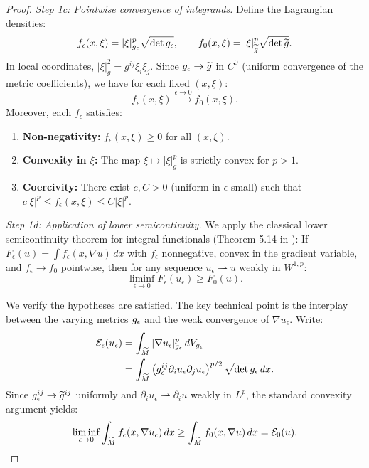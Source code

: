 \begin{proof}
\textit{Step 1c: Pointwise convergence of integrands.}
Define the Lagrangian densities:
\[
    f_\epsilon(x,\xi) = |\xi|_{g_\epsilon}^p \sqrt{\det g_\epsilon}, \qquad f_0(x,\xi) = |\xi|_{\widetilde{g}}^p \sqrt{\det \widetilde{g}}.
\]
In local coordinates, $|\xi|_g^2 = g^{ij}\xi_i \xi_j$. Since $g_\epsilon \to \widetilde{g}$ in $C^0$ (uniform convergence of the metric coefficients), we have for each fixed $(x,\xi)$:
\[
    f_\epsilon(x,\xi) \xrightarrow{\epsilon \to 0} f_0(x,\xi).
\]
Moreover, each $f_\epsilon$ satisfies:
\begin{enumerate}
    \item[(i)] \textbf{Non-negativity:} $f_\epsilon(x,\xi) \ge 0$ for all $(x,\xi)$.
    \item[(ii)] \textbf{Convexity in $\xi$:} The map $\xi \mapsto |\xi|_g^p$ is strictly convex for $p > 1$.
    \item[(iii)] \textbf{Coercivity:} There exist $c, C > 0$ (uniform in $\epsilon$ small) such that $c|\xi|^p \le f_\epsilon(x,\xi) \le C|\xi|^p$.
\end{enumerate}

\textit{Step 1d: Application of lower semicontinuity.}
We apply the classical lower semicontinuity theorem for integral functionals (Theorem 5.14 in \cite{dalmaso1993}): If $F_\epsilon(u) = \int f_\epsilon(x, \nabla u) \, dx$ with $f_\epsilon$ nonnegative, convex in the gradient variable, and $f_\epsilon \to f_0$ pointwise, then for any sequence $u_\epsilon \rightharpoonup u$ weakly in $W^{1,p}$:
\[
    \liminf_{\epsilon \to 0} F_\epsilon(u_\epsilon) \ge F_0(u).
\]

We verify the hypotheses are satisfied. The key technical point is the interplay between the varying metrics $g_{\epsilon}$ and the weak convergence of $\nabla u_\epsilon$. Write:
\begin{align*}
    \mathcal{E}_\epsilon(u_\epsilon) &= \int_{\widetilde{M}} |\nabla u_\epsilon|_{g_{\epsilon}}^p \, dV_{g_{\epsilon}} \\
    &= \int_{\widetilde{M}} \left( g_\epsilon^{ij} \partial_i u_\epsilon \partial_j u_\epsilon \right)^{p/2} \sqrt{\det g_\epsilon} \, dx.
\end{align*}
Since $g_\epsilon^{ij} \to \widetilde{g}^{ij}$ uniformly and $\partial_i u_\epsilon \rightharpoonup \partial_i u$ weakly in $L^p$, the standard convexity argument yields:
\[
    \liminf_{\epsilon \to 0} \int_{\widetilde{M}} f_\epsilon(x, \nabla u_\epsilon) \, dx \ge \int_{\widetilde{M}} f_0(x, \nabla u) \, dx = \mathcal{E}_0(u).
\]


\end{proof}

